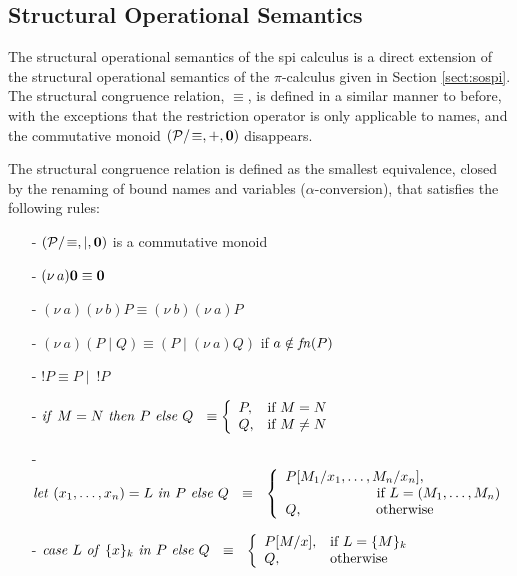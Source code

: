 \documentclass[10pt,a4paper,final,oneside,fleqn]{book}
\begin{document}
\subsection{Structural Operational Semantics}
The structural operational semantics of the spi calculus is a direct extension of the structural operational semantics of the $\pi$-calculus given in Section \ref{sect:sospi}. The structural congruence relation, $\equiv$, is defined in a similar manner to before, with the exceptions that the restriction operator is only applicable to names, and the commutative monoid $(\mathcal{P}/\!\equiv,+,{\bf 0})$ disappears.

The structural congruence relation is defined as the smallest equivalence, closed by the renaming of bound names and variables ($\alpha$-conversion), that satisfies the following rules:
\begin{itemize}
\item[-]
$(\mathcal{P}/\!\equiv,\mid,{\bf 0})$ is a commutative monoid
\item[-]
$(\nu~\!a){\bf 0}\equiv{\bf 0}$
\item[-]
$(\nu~\!a)(\nu~\!b)P\equiv(\nu~\!b)(\nu~\!a)P$
\item[-]
$(\nu~\!a)(P\mid Q)\equiv(P\mid(\nu~\!a)Q)$ if $a\notin\mbox{{\itshape fn\/}}(P)$
\item[-]
$!P\equiv P\mid~!P$
\item[-]
$\mbox{{\itshape if\/} }M=N\mbox{ {\itshape then\/} }P\mbox{ {\itshape else\/} }Q~~\equiv\left\{\begin{array}{ll}P,&\mbox{if }M=N\\Q,&\mbox{if }M\ne N\\\end{array}\right.$
\item[-]
$\mbox{{\itshape let\/} }(x_1,\ldots,x_n)=L\mbox{ {\itshape in\/} }P\mbox{ {\itshape else\/} }Q~~\equiv~~\left\{\begin{array}{ll}
P[M_1/x_1,\ldots,M_n/x_n],&\\\multicolumn{2}{l}{\hspace{23mm}\mbox{if }L=(M_1,\ldots,M_n)}\\
\multicolumn{2}{l}{Q,\hspace{18.5mm}\mbox{otherwise}}\end{array}\right.$
\item[-] $\mbox{{\itshape case\/} }L\mbox{ {\itshape of\/} }\{x\}_k\mbox{ {\itshape in\/} }P\mbox{ {\itshape else\/} }Q~~\equiv~~\left\{\begin{array}{ll}P[M/x],&\mbox{if }L=\{M\}_k\\Q,&\mbox{otherwise}\end{array}\right.$

\end{itemize}
\end{document}
